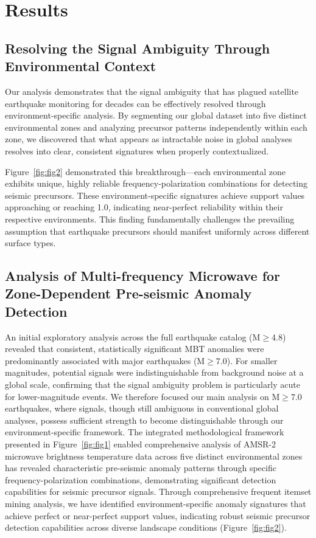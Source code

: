 \documentclass[preprint,review,12pt,authoryear]{elsarticle}
\providecommand{\DIFaddend}{} %
\DeclareRobustCommand{\DIFaddend}{\DIFOaddend \let\includegraphics\DIFOincludegraphics} %
\begin{document}
\DIFaddend \section{Results}
\subsection{Resolving the Signal Ambiguity Through Environmental Context}
Our analysis demonstrates that the signal ambiguity that has plagued satellite earthquake monitoring for decades can be effectively resolved through environment-specific analysis. By segmenting our global dataset into five distinct environmental zones and analyzing precursor patterns independently within each zone, we discovered that what appears as intractable noise in global analyses resolves into clear, consistent signatures when properly contextualized.

Figure~\ref{fig:fig2} demonstrated this breakthrough---each environmental zone exhibits unique, highly reliable frequency-polarization combinations for detecting seismic precursors. These environment-specific signatures achieve support values approaching or reaching 1.0, indicating near-perfect reliability within their respective environments. This finding fundamentally challenges the prevailing assumption that earthquake precursors should manifest uniformly across different surface types.

\subsection{Analysis of Multi-frequency Microwave for Zone-Dependent Pre-seismic Anomaly Detection}
An initial exploratory analysis across the full earthquake catalog (M$\ge$4.8) revealed that consistent, statistically significant MBT anomalies were predominantly associated with major earthquakes (M$\ge$7.0). For smaller magnitudes, potential signals were indistinguishable from background noise at a global scale, confirming that the signal ambiguity problem is particularly acute for lower-magnitude events. We therefore focused our main analysis on M$\ge$7.0 earthquakes, where signals, though still ambiguous in conventional global analyses, possess sufficient strength to become distinguishable through our environment-specific framework. The integrated methodological framework presented in Figure~\ref{fig:fig1} enabled comprehensive analysis of AMSR-2 microwave brightness temperature data across five distinct environmental zones has revealed characteristic pre-seismic anomaly patterns through specific frequency-polarization combinations, demonstrating significant detection capabilities for seismic precursor signals. Through comprehensive frequent itemset mining analysis, we have identified environment-specific anomaly signatures that achieve perfect or near-perfect support values, indicating robust seismic precursor detection capabilities across diverse landscape conditions (Figure~\ref{fig:fig2}).
\end{document}
